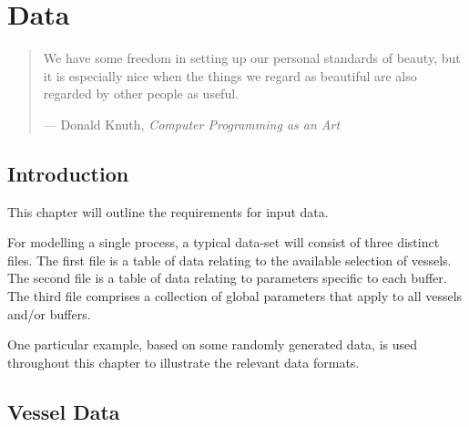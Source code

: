%
%
%
%

\chapter{Data}\label{C.data}

\begin{quote}
We have some freedom in setting up our personal standards of beauty, but it is
especially nice when the things we regard as beautiful are also regarded by
other people as useful.

\hspace{2cm}--- Donald Knuth, \emph{Computer Programming as an Art}
\end{quote}

\section{Introduction}\label{S.intro3}
This chapter will outline the requirements for input data.

For modelling a single process, a typical data-set will consist of three
distinct files.
The first file is a table of data relating to the available selection of
vessels.
The second file is a table of data relating to parameters specific
to each buffer.
The third file comprises a collection of global parameters
that apply to all vessels and/or buffers.

One particular example, based on some randomly generated data, is used
throughout this chapter to illustrate the relevant data formats.

\section{Vessel Data}\label{S.vesseldata}

